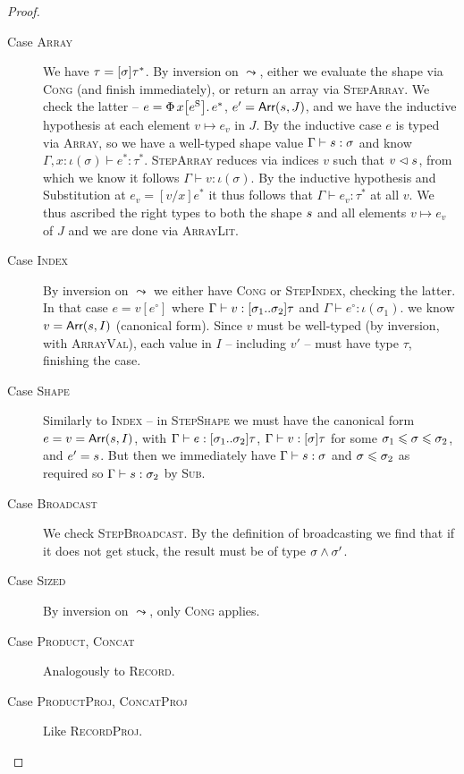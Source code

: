 \begin{proof}
\begin{description}
    \item[Case \textsc{Array}] We have $\tau = \suniarraytype{\sigma}{\tau^*}$. By inversion on $\leadsto$, either we evaluate the shape via \textsc{Cong} (and finish immediately), or return an array via \textsc{StepArray}. We check the latter -- $e = \sbuild{x}{\eess}{e^*}$, $e' = \textsf{Arr}(s,J)$, and we have the inductive hypothesis at each element $v \mapsto e_v$ in $J$. By the inductive case $e$ is typed via \textsc{Array}, so we have a well-typed shape value $\Gamma \vdash s : \sigma$ and know $\Gamma, x : \iota(\sigma) \vdash e^* : \tau^*$. \textsc{StepArray} reduces via indices $v$ such that $v \vartriangleleft s$, from which we know it follows $\Gamma \vdash v : \iota(\sigma)$. By the inductive hypothesis and Substitution at $e_v = [v/x]e^*$ it thus follows that $\Gamma \vdash e_v : \tau^*$ at all $v$. We thus ascribed the right types to both the shape $s$ and all elements $v \mapsto e_v$ of $J$ and we are done via \textsc{ArrayLit}.
    \item[Case \textsc{Index}] By inversion on $\leadsto$ we either have \textsc{Cong} or \textsc{StepIndex}, checking the latter. In that case $e = v[e^\circ]$ where $\Gamma \vdash v : \sarraytype{\sigma_1}{\sigma_2}{\tau}$ and $\Gamma \vdash e^\circ : \iota(\sigma_1)$. we know $v = \textsf{Arr}(s,I)$ (canonical form). Since $v$ must be well-typed (by inversion, with \textsc{ArrayVal}), each value in $I$ -- including $v'$ -- must have type $\tau$, finishing the case.
    \item[Case \textsc{Shape}] Similarly to \textsc{Index} -- in \textsc{StepShape} we must have the canonical form $e = v = \textsf{Arr}(s,I)$, with $\Gamma \vdash e : \sarraytype{\sigma_1}{\sigma_2}{\tau}$, $\Gamma \vdash v : \suniarraytype{\sigma}{\tau}$ for some $\sigma_1 \leqslant \sigma \leqslant \sigma_2$, and $e' = s$. But then we immediately have $\Gamma \vdash s : \sigma$ and $\sigma \leqslant \sigma_2$ as required so $\Gamma \vdash s : \sigma_2$ by \textsc{Sub}.
    \item[Case \textsc{Broadcast}] We check \textsc{StepBroadcast}. By the definition of broadcasting we find that if it does not get stuck, the result must be of type $\sigma \land \sigma'$.
    \item[Case \textsc{Sized}] By inversion on $\leadsto$, only \textsc{Cong} applies.
    \item[Case \textsc{Product}, \textsc{Concat}] Analogously to \textsc{Record}.
    \item[Case \textsc{ProductProj}, \textsc{ConcatProj}] Like \textsc{RecordProj}.
\end{description}
\end{proof}

